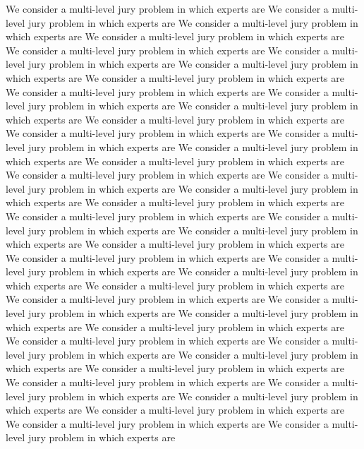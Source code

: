 \documentclass[letterpaper]{article}
\numberwithin{equation}{section}	%
\begin{document}
\small
We consider a multi-level jury problem in which experts are
We consider a multi-level jury problem in which experts are
We consider a multi-level jury problem in which experts are
We consider a multi-level jury problem in which experts are
We consider a multi-level jury problem in which experts are
We consider a multi-level jury problem in which experts are
We consider a multi-level jury problem in which experts are
We consider a multi-level jury problem in which experts are
We consider a multi-level jury problem in which experts are
We consider a multi-level jury problem in which experts are
We consider a multi-level jury problem in which experts are
We consider a multi-level jury problem in which experts are
We consider a multi-level jury problem in which experts are
We consider a multi-level jury problem in which experts are
We consider a multi-level jury problem in which experts are
We consider a multi-level jury problem in which experts are
We consider a multi-level jury problem in which experts are
We consider a multi-level jury problem in which experts are
We consider a multi-level jury problem in which experts are
We consider a multi-level jury problem in which experts are
We consider a multi-level jury problem in which experts are
We consider a multi-level jury problem in which experts are
We consider a multi-level jury problem in which experts are
We consider a multi-level jury problem in which experts are
We consider a multi-level jury problem in which experts are
We consider a multi-level jury problem in which experts are
We consider a multi-level jury problem in which experts are
We consider a multi-level jury problem in which experts are
We consider a multi-level jury problem in which experts are
We consider a multi-level jury problem in which experts are
We consider a multi-level jury problem in which experts are
We consider a multi-level jury problem in which experts are
We consider a multi-level jury problem in which experts are
We consider a multi-level jury problem in which experts are
We consider a multi-level jury problem in which experts are
We consider a multi-level jury problem in which experts are
We consider a multi-level jury problem in which experts are
We consider a multi-level jury problem in which experts are
We consider a multi-level jury problem in which experts are
We consider a multi-level jury problem in which experts are
We consider a multi-level jury problem in which experts are
We consider a multi-level jury problem in which experts are
\end{document}
